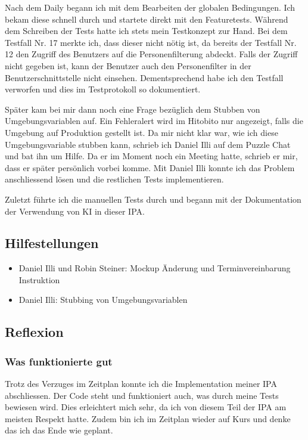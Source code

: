 Nach dem Daily begann ich mit dem Bearbeiten der globalen Bedingungen. Ich bekam diese schnell durch und startete direkt mit den Featuretests.
Während dem Schreiben der Tests hatte ich stets mein Testkonzept zur Hand. Bei dem Testfall Nr. 17 merkte ich, dass dieser nicht nötig ist, da bereits der Testfall Nr. 12
den Zugriff des Benutzers auf die Personenfilterung abdeckt. Falls der Zugriff nicht gegeben ist, kann der Benutzer auch den Personenfilter in der Benutzerschnittstelle nicht einsehen.
Dementsprechend habe ich den Testfall verworfen und dies im Testprotokoll so dokumentiert. 

Später kam bei mir dann noch eine Frage bezüglich dem Stubben von Umgebungsvariablen auf. Ein Fehleralert wird im Hitobito nur angezeigt,
falls die Umgebung auf Produktion gestellt ist. Da mir nicht klar war, wie ich diese Umgebungsvariable stubben kann, schrieb ich Daniel Illi auf dem Puzzle Chat und bat ihn um 
Hilfe. Da er im Moment noch ein Meeting hatte, schrieb er mir, dass er später persönlich vorbei komme. Mit Daniel Illi konnte ich das Problem anschliessend lösen und 
die restlichen Tests implementieren.

Zuletzt führte ich die manuellen Tests durch und begann mit der Dokumentation der Verwendung von KI in dieser IPA.

\subsection*{Hilfestellungen}
\begin{itemize}
    \item Daniel Illi und Robin Steiner: Mockup Änderung und Terminvereinbarung Instruktion
    \item Daniel Illi: Stubbing von Umgebungsvariablen
\end{itemize}

\subsection*{Reflexion}

\subsubsection*{Was funktionierte gut}
Trotz des Verzuges im Zeitplan konnte ich die Implementation meiner IPA abschliessen. Der Code steht und funktioniert auch, was durch meine
Tests bewiesen wird. Dies erleichtert mich sehr, da ich von diesem Teil der IPA am meisten Respekt hatte. Zudem bin ich im Zeitplan wieder auf Kurs
und denke das ich das Ende wie geplant. 

